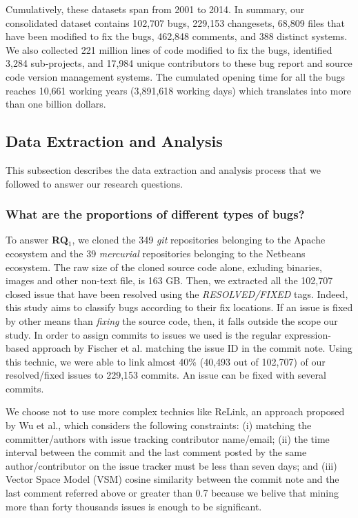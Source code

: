 Cumulatively, these datasets span from 2001 to 2014. In summary, our consolidated dataset contains 102,707 bugs, 229,153 changesets, 68,809 files that have been modified to fix the bugs, 462,848 comments, and 388 distinct systems.
We also collected 221 million lines of code modified to fix the bugs, identified 3,284 sub-projects, and 17,984 unique contributors to these bug report and source code version management systems.
The cumulated opening time for all the bugs reaches 10,661 working years (3,891,618 working days) which translates into more than one billion dollars\cite{Usnews}.

\subsection{Data Extraction and Analysis}

This subsection describes the data extraction and analysis process that we followed to answer our research questions.

\subsubsection{What are the proportions of different types of bugs?} To answer {\bf RQ$_1$}, we cloned the 349 {\it git} repositories belonging to the Apache ecosystem and the 39 {\it mercurial} repositories belonging to the Netbeans ecosystem.
The raw size of the cloned source code alone, exluding binaries, images and other non-text file, is 163 GB.
Then, we extracted all the 102,707 closed issue that have been resolved using the {\it RESOLVED/FIXED} tags.
Indeed, this study aims to classify bugs according to their fix locations.
If an issue is fixed by other means than {\it fixing} the source code, then, it falls outside the scope our study.
In order to assign commits to issues we used is the regular expression-based approach by Fischer et al. \cite{Fischer} matching the issue ID in the commit note.
Using this technic, we were able to link almost 40\% (40,493 out of 102,707) of our resolved/fixed issues to 229,153 commits.
An issue can be fixed with several commits.

We choose not to use more complex technics like ReLink, an approach proposed by Wu et al.\cite{Wu2011}, which considers the following constraints: (i) matching the committer/authors with issue tracking contributor name/email; (ii) the time interval between the commit and the last comment posted by the same author/contributor on the issue tracker must be less than seven days; and (iii) Vector Space Model (VSM) cosine similarity between the commit note and the last comment referred above or greater than 0.7 because we belive that mining more than forty thousands issues is enough to be significant.

